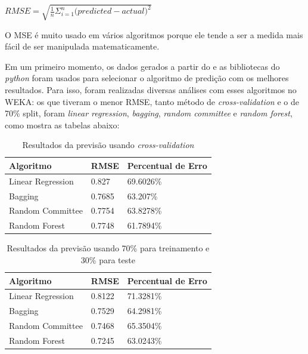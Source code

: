 $RMSE = \sqrt{\frac{1}{n}\Sigma_{i=1}^{n}{\Big({predicted-actual}\Big)^2}}$
 
O MSE é muito usado em vários algoritmos porque ele tende a ser a medida mais fácil de ser manipulada matematicamente.

Em um primeiro momento, os dados gerados a partir do \pdi e as bibliotecas do \textit{python} foram usados para selecionar o algoritmo de predição com os melhores resultados. Para isso, foram realizadas diversas análises com esses algoritmos no WEKA: os que tiveram o menor RMSE, tanto método de \textit{cross-validation} e o de 70\% split, foram \textit{linear regression}, \textit{bagging}, \textit{random committee} e \textit{random forest}, como mostra as tabelas abaixo:

\begin{longtable}{|l|l|l|}
\caption{Resultados da previsão usando \textit{cross-validation}}
\label{cvfull}
\\ \hline
\textbf{Algoritmo} & \textbf{RMSE} & \textbf{Percentual de Erro} \\ \hline
Linear Regression      & 0.827         & 69.6026\%                   \\ \hline
Bagging                & 0.7685        & 63.207\%                    \\ \hline
Random Committee       & 0.7754        & 63.8278\%                     \\ \hline
Random Forest          & 0.7748        & 61.7894\%                     \\ \hline
\end{longtable}


\begin{longtable}{|l|l|l|}
\caption{Resultados da previsão usando 70\% para treinamento e 30\% para teste}
\label{splitfull}
\\\hline
\textbf{Algoritmo} & \textbf{RMSE} & \textbf{Percentual de Erro} \\ \hline
Linear Regression      & 0.8122        & 71.3281\%                   \\ \hline
Bagging                & 0.7529        & 64.2981\%                   \\ \hline
Random Committee       & 0.7468        & 65.3504\%                   \\ \hline
Random Forest          & 0.7245        & 63.0243\%                   \\ \hline
\end{longtable}



